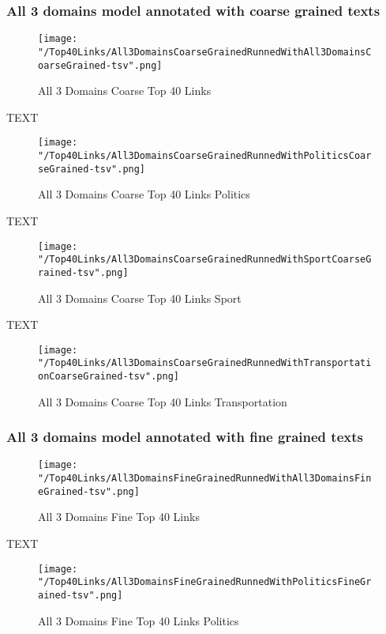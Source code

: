 \documentclass[thesis=M,english]{FITthesis}[2018/05/30]
\begin{document}
	\subsubsection{All 3 domains model annotated with coarse grained texts}
	\begin{figure}[H]\centering
		\texttt{[image: "/Top40Links/All3DomainsCoarseGrainedRunnedWithAll3DomainsCoarseGrained-tsv".png]}
		\caption{All 3 Domains Coarse Top 40 Links}\label{}
	\end{figure}

	TEXT

	\begin{figure}[H]\centering
		\texttt{[image: "/Top40Links/All3DomainsCoarseGrainedRunnedWithPoliticsCoarseGrained-tsv".png]}
		\caption{All 3 Domains Coarse Top 40 Links Politics}\label{}
	\end{figure}	

	TEXT	

	\begin{figure}[H]\centering
		\texttt{[image: "/Top40Links/All3DomainsCoarseGrainedRunnedWithSportCoarseGrained-tsv".png]}
		\caption{All 3 Domains Coarse Top 40 Links Sport}\label{}
	\end{figure}
	
		TEXT	

	\begin{figure}[H]\centering
		\texttt{[image: "/Top40Links/All3DomainsCoarseGrainedRunnedWithTransportationCoarseGrained-tsv".png]}
		\caption{All 3 Domains Coarse Top 40 Links Transportation}\label{}	
	\end{figure}
		
	\subsubsection{All 3 domains model annotated with fine grained texts}	
	\begin{figure}[H]\centering
		\texttt{[image: "/Top40Links/All3DomainsFineGrainedRunnedWithAll3DomainsFineGrained-tsv".png]}
		\caption{All 3 Domains Fine Top 40 Links }\label{}	
	\end{figure}
	
	TEXT

	\begin{figure}[H]\centering
		\texttt{[image: "/Top40Links/All3DomainsFineGrainedRunnedWithPoliticsFineGrained-tsv".png]}
		\caption{All 3 Domains Fine Top 40 Links Politics}\label{}
	\end{figure}	
\end{document}
